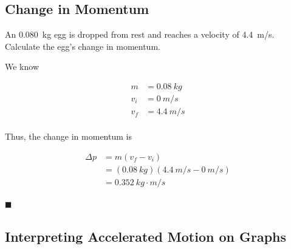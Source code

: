 \documentclass[answers]{exam}
\begin{document}
\clearpage

\subsection*{Change in Momentum}

\begin{questions}
\question
An \SI{0.080}{kg} egg is dropped from rest and reaches a velocity of \SI{4.4}{m/s}. Calculate the egg's change in momentum.

\begin{solution}
We know

\vspace{-1em}
\begin{align*}
    m &= \SI{0.08}{kg} \\[1ex]
    v_i &= \SI{0}{m/s} \\[1ex]
    v_f &= \SI{4.4}{m/s} \\[1ex]
\end{align*}

Thus, the change in momentum is

\vspace{-1em}
\begin{align*}
    \Delta p &= m (v_f - v_i) \\[1ex]
    &= (\SI{0.08}{kg})(\SI{4.4}{m/s} - \SI{0}{m/s}) \\[1ex]
    &= \boxed{\SI{0.352}{kg\cdot m/s}}
\end{align*}

\hfill $\blacksquare$
\end{solution}


\end{questions}

\clearpage

\subsection*{Interpreting Accelerated Motion on Graphs}
\end{document}
